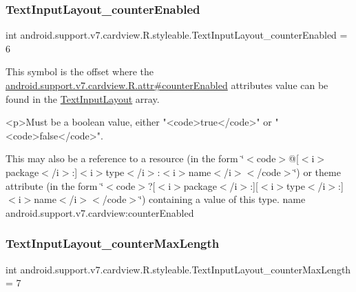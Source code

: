 \subsubsection{\texorpdfstring{Text\+Input\+Layout\+\_\+counter\+Enabled}{TextInputLayout\_counterEnabled}}
{\footnotesize\ttfamily int android.\+support.\+v7.\+cardview.\+R.\+styleable.\+Text\+Input\+Layout\+\_\+counter\+Enabled = 6\hspace{0.3cm}{\ttfamily [static]}}

This symbol is the offset where the \hyperlink{classandroid_1_1support_1_1v7_1_1cardview_1_1R_1_1attr_ae86ff72f000a932b1608cfcce46c61a4}{android.\+support.\+v7.\+cardview.\+R.\+attr\#counter\+Enabled} attribute\textquotesingle{}s value can be found in the \hyperlink{classandroid_1_1support_1_1v7_1_1cardview_1_1R_1_1styleable_a9b23c31ffaf354f0f5cc4b82392ef6a4}{Text\+Input\+Layout} array.

\begin{DoxyVerb}      <p>Must be a boolean value, either "<code>true</code>" or "<code>false</code>".
\end{DoxyVerb}
 

This may also be a reference to a resource (in the form \char`\"{}$<$code$>$@\mbox{[}$<$i$>$package$<$/i$>$\+:\mbox{]}$<$i$>$type$<$/i$>$\+:$<$i$>$name$<$/i$>$$<$/code$>$\char`\"{}) or theme attribute (in the form \char`\"{}$<$code$>$?\mbox{[}$<$i$>$package$<$/i$>$\+:\mbox{]}\mbox{[}$<$i$>$type$<$/i$>$\+:\mbox{]}$<$i$>$name$<$/i$>$$<$/code$>$\char`\"{}) containing a value of this type.  name android.\+support.\+v7.\+cardview\+:counter\+Enabled \mbox{\label{classandroid_1_1support_1_1v7_1_1cardview_1_1R_1_1styleable_a27208f96108863c14673fcbb37b76c90}} 
\subsubsection{\texorpdfstring{Text\+Input\+Layout\+\_\+counter\+Max\+Length}{TextInputLayout\_counterMaxLength}}
{\footnotesize\ttfamily int android.\+support.\+v7.\+cardview.\+R.\+styleable.\+Text\+Input\+Layout\+\_\+counter\+Max\+Length = 7\hspace{0.3cm}{\ttfamily [static]}}

